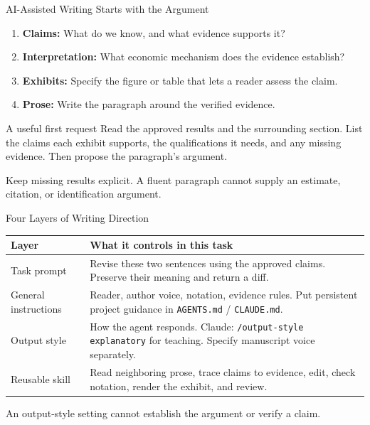 \begin{frame}{AI-Assisted Writing Starts with the Argument}
\begin{enumerate}\setlength{\itemsep}{0.2cm}
\item \textbf{Claims:} What do we know, and what evidence supports it?
\item \textbf{Interpretation:} What economic mechanism does the evidence establish?
\item \textbf{Exhibits:} Specify the figure or table that lets a reader assess the claim.
\item \textbf{Prose:} Write the paragraph around the verified evidence.
\end{enumerate}
\par\vspace{0.2cm}
\begin{block}{A useful first request}
Read the approved results and the surrounding section. List the claims each exhibit supports, the qualifications it needs, and any missing evidence. Then propose the paragraph's argument.
\end{block}
\small Keep missing results explicit. A fluent paragraph cannot supply an estimate, citation, or identification argument.
\end{frame}

\begin{frame}{Four Layers of Writing Direction}
\small
\renewcommand{\arraystretch}{1.15}
\begin{tabular}{>{\raggedright\arraybackslash}p{2.45cm}>{\raggedright\arraybackslash}p{10.2cm}}
\toprule
\textbf{Layer} & \textbf{What it controls in this task} \\
\midrule
Task prompt & Revise these two sentences using the approved claims. Preserve their meaning and return a diff. \\
General instructions & Reader, author voice, notation, evidence rules. Put persistent project guidance in \texttt{AGENTS.md} / \texttt{CLAUDE.md}. \\
Output style & How the agent responds. Claude: \texttt{/output-style explanatory} for teaching. Specify manuscript voice separately. \\
Reusable skill & Read neighboring prose, trace claims to evidence, edit, check notation, render the exhibit, and review. \\
\bottomrule
\end{tabular}
\par\vspace{0.25cm}
\normalsize An output-style setting cannot establish the argument or verify a claim.
\par\vfill
{}
\end{frame}

